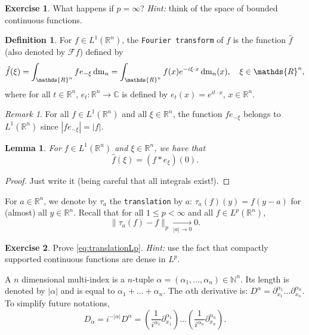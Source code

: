 \documentclass[a4paper, 12pt]{article}
\theoremstyle{plain}
\newtheorem{lemma}[proposition]{Lemma}
\theoremstyle{definition}
\newtheorem{definition}[proposition]{Definition}
\newtheorem{exercise}{Exercise}
\theoremstyle{remark}
\newtheorem{remark}[proposition]{Remark}
\numberwithin{equation}{section}
\begin{document}
\begin{exercise}
What happens if $p=\infty$? {\sl Hint:} think of the space of bounded continuous functions.
\end{exercise}

\begin{definition}
For $f \in L^1({\mathds{R}}^n)$, the {\tt Fourier transform} of $f$ is the function $\hat{f}$ (also denoted by ${\mathscr{F}} f$) defined by
%
\begin{equation}
\label{eq:defFourier}
\hat{f} (\xi) = \int_{{\mathds{R}}^n} f e_{-\xi} \,{\rm dm}_n = \int_{{\mathds{R}}^n} f(x) e^{-i\xi\cdot x} \,{\rm dm}_n(x), \quad \xi \in {\mathds{R}}^n,
\end{equation}
%
where for all $t\in {\mathds{R}}^n$, $e_{t}:{\mathds{R}}^n\to {\mathds{C}}$ is defined by $e_t(x)=e^{it\cdot x}$, $x\in{\mathds{R}}^n$.
\end{definition}

\begin{remark}
For all $f \in L^1({\mathds{R}}^n)$ and all $\xi\in{\mathds{R}}^n$, the function $fe_{-\xi}$ belongs to $L^1({\mathds{R}}^n)$ since
$|fe_{-\xi}|=|f|$.
\end{remark}

\begin{lemma} \label{fourier-conv}
For $f \in L^1({\mathds{R}}^n)$ and $\xi\in{\mathds{R}}^n$, we have that 
\[
\hat{f} (\xi) = (f * e_\xi)(0).
\]
\end{lemma}

\begin{proof}
Just write it (being careful that all integrals exist!).
\end{proof}

For $a \in {\mathds{R}}^n$, we denote by $\tau_a$ the {\tt translation} by $a$: $\tau_a (f) (y) = f(y-a)$ for (almost) all $y \in {\mathds{R}}^n$.
Recall that for all $1\le p<\infty$ and all $f\in L^p({\mathds{R}}^n)$, 
%
\begin{equation}
\label{eq:translationLp}
\|\tau_a(f)-f\|_p\xrightarrow[|a|\to0]{}0.
\end{equation}

\begin{exercise}
Prove \eqref{eq:translationLp}. {\sl Hint:} use the fact that compactly supported continuous functions are dense in $L^p$.
\end{exercise}

A $n$ dimensional multi-index is a $n$-tuple $\alpha = (\alpha_1, ... , \alpha_n) \in {\mathds{N}}^n$. Its length is denoted by
$|\alpha|$ and is equal to $\alpha_1 + ... + \alpha_n$. The $\alpha$th derivative is: 
$D^\alpha = \partial_{x_1}^{\alpha_1} ...  \partial_{x_n}^{\alpha_n}$. To simplify future notations,
\[
D_\alpha = i^{-|\alpha|} D^\alpha = \left(\frac{1}{i^{\alpha_1}}\partial_{x_1}^{\alpha_1}\right) ... \left(\frac{1}{i^{\alpha_n}}\partial_{x_n}^{\alpha_n}\right).
\]
\end{document}
